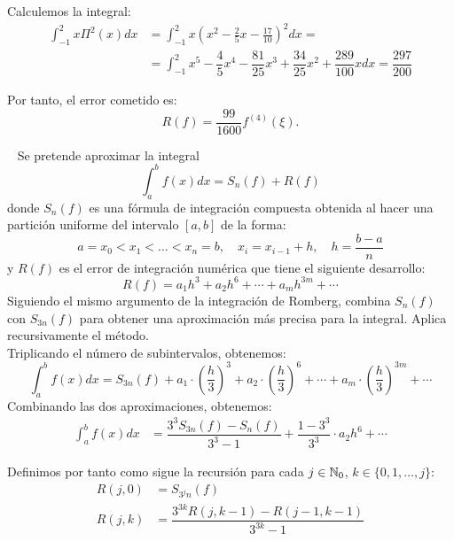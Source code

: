 \begin{ejercicio}
\begin{enumerate}
        Calculemos la integral:
        \begin{align*}
            \int_{-1}^{2} x\Pi^2(x)dx &= \int_{-1}^{2} x\left(x^2 - \frac{2}{5}x - \frac{17}{10}\right)^2dx
            =\\&= \int_{-1}^{2} x^5 - \dfrac{4}{5}x^4 - \dfrac{81}{25}x^3 + \dfrac{34}{25}x^2 + \dfrac{289}{100}x dx
            = \dfrac{297}{200}
        \end{align*}

        Por tanto, el error cometido es:
        \begin{equation*}
            R(f) = \dfrac{99}{1600}f^{(4)}(\xi).
        \end{equation*}
    \end{enumerate}
\end{ejercicio}

\begin{ejercicio}~\label{ej:2.3.6}
    Se pretende aproximar la integral
    \begin{equation*}
        \int_{a}^{b} f(x)dx = S_n(f) + R(f)
    \end{equation*}
    donde $S_n(f)$ es una fórmula de integración compuesta obtenida al hacer una partición uniforme del intervalo $[a, b]$ de la forma:
    \begin{equation*}
        a = x_0 < x_1 < \ldots < x_n = b, \quad x_i = x_{i-1} + h, \quad h = \frac{b - a}{n}
    \end{equation*}
    y $R(f)$ es el error de integración numérica que tiene el siguiente desarrollo:
    \begin{equation*}
        R(f) = a_1h^3 + a_2h^6 + \cdots + a_mh^{3m} + \cdots
    \end{equation*}
    Siguiendo el mismo argumento de la integración de Romberg, combina $S_n(f)$ con $S_{3n}(f)$ para obtener una aproximación más precisa para la integral. Aplica recursivamente el método.\\

    Triplicando el número de subintervalos, obtenemos:
    \begin{equation*}
        \int_{a}^{b} f(x)dx = S_{3n}(f) + a_1\cdot \left(\dfrac{h}{3}\right)^3 + a_2\cdot \left(\dfrac{h}{3}\right)^6 + \cdots + a_m\cdot \left(\dfrac{h}{3}\right)^{3m} + \cdots
    \end{equation*}
    Combinando las dos aproximaciones, obtenemos:
    \begin{align*}
        \int_{a}^{b} f(x)dx &= \dfrac{3^3S_{3n}(f)-S_n(f)}{3^3-1} + \dfrac{1-3^3}{3^3}\cdot a_2h^6 + \cdots
    \end{align*}

    Definimos por tanto como sigue la recursión para cada $j\in \mathbb{N}_0$, $k\in \{0,1,\dots, j\}$:
    \begin{align*}
        R(j,0) &= S_{3^j n}(f)\\
        R(j,k) &= \dfrac{3^{3k}R(j, k-1) - R(j-1,k-1)}{3^{3k} - 1}
    \end{align*}


\end{ejercicio}

